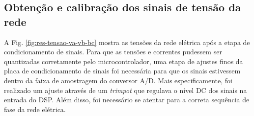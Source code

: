 \subsection{Obtenção e calibração dos sinais de tensão da rede}

A Fig. \ref{fig:res-tensao-va-vb-bc} mostra as tensões da rede elétrica após a etapa de condicionamento de sinais.
Para que as tensões e correntes pudessem ser quantizadas corretamente pelo microcontrolador, 
uma etapa de ajustes finos da placa de condicionamento de sinais foi necessária para que os sinais estivessem dentro da faixa de amostragem do conversor A/D.
Mais especificamente, foi realizado um ajuste através de um \textit{trimpot} que regulava o nível DC dos sinais na entrada do DSP.
Além disso, foi necessário se atentar para a correta sequência de fase da rede elétrica.

